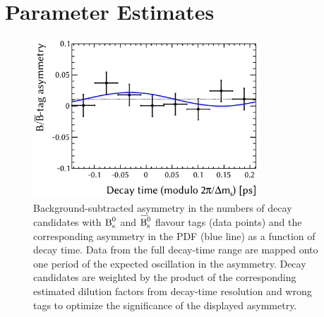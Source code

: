 \section{Parameter Estimates}
\label{sec:result_paramEst}

\begin{figure}[htbp]
  \centering
  \includegraphics[width=0.75\textwidth]{graphics/results/asym}
  \caption{Background-subtracted asymmetry in the numbers of decay candidates with $\text{B}_\text{s}^\text{0}$ and $\Bsbar$ flavour tags (data points)
           and the corresponding asymmetry in the PDF (blue line) as a function of decay time.
           Data from the full decay-time range are mapped onto one period of the expected oscillation in the asymmetry.
           Decay candidates are weighted by the product of the corresponding estimated dilution factors from decay-time resolution
           and wrong tags to optimize the significance of the displayed asymmetry.}
  \label{fig:BBbarAsymmetry}
\end{figure}

